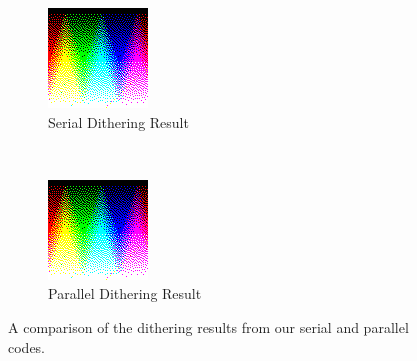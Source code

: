 \documentclass{article}
\begin{document}
\begin{figure}[h]
  \centering
  \begin{subfigure}[t]{0.30\textwidth}
    \centering
    \includegraphics[width=\textwidth]{images/dithered_RGB_color_gradient_100x100.png}
    \caption{Serial Dithering Result}
    \label{fig:serial_dithering_confirmation}
  \end{subfigure}
  ~
  \begin{subfigure}[t]{0.30\textwidth}
    \centering
    \includegraphics[width=\textwidth]{images/parallel_dithered_RGB_color_gradient_100x100.png}
    \caption{Parallel Dithering Result}
    \label{fig:parallel_dithering_confirmation}
  \end{subfigure}
  \caption{A comparison of the dithering results from our serial and parallel codes.}
\end{figure}
\end{document}
